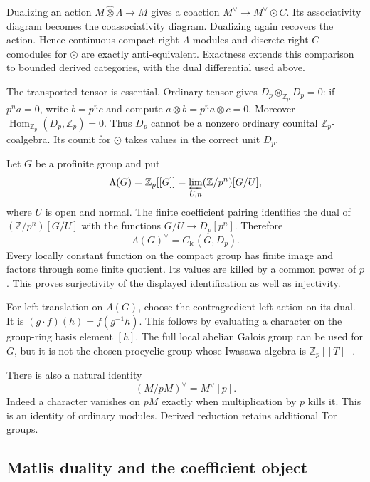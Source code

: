 Dualizing an action $M\widehat\otimes\Lambda\to M$ gives a
coaction $M^\vee\to M^\vee\odot C$. Its associativity diagram
becomes the coassociativity diagram. Dualizing again recovers the
action. Hence continuous compact right $\Lambda$-modules and
discrete right $C$-comodules for $\odot$ are exactly
anti-equivalent. Exactness extends this comparison to bounded
derived categories, with the dual differential used above.

The transported tensor is essential. Ordinary tensor gives
$D_p\otimes_{\mathbb Z_p}D_p=0$: if $p^na=0$, write $b=p^nc$
and compute $a\otimes b=p^na\otimes c=0$.
Moreover $\operatorname{Hom}_{\mathbb Z_p}(D_p,\mathbb Z_p)=0$.
Thus $D_p$ cannot be a nonzero ordinary counital
$\mathbb Z_p$-coalgebra. Its counit for $\odot$ takes values in
the correct unit $D_p$.

Let $G$ be a profinite group and put
\[
 \Lambda(G)=\mathbb Z_p[[G]]
 =\varprojlim_{U,n}(\mathbb Z/p^n)[G/U],
\]
where $U$ is open and normal. The finite coefficient pairing
identifies the dual of $(\mathbb Z/p^n)[G/U]$ with the functions
$G/U\to D_p[p^n]$. Therefore
\begin{equation}\label{v4-arith:md:eq:iwasawa-dual}
 \Lambda(G)^\vee=C_{\mathrm{lc}}(G,D_p).
\end{equation}
Every locally constant function on the compact group has finite
image and factors through some finite quotient. Its values are
killed by a common power of $p$. This proves surjectivity of the
displayed identification as well as injectivity.

For left translation on $\Lambda(G)$, choose the contragredient
left action on its dual. It is
$(g\cdot f)(h)=f(g^{-1}h)$. This follows by evaluating a character
on the group-ring basis element $[h]$. The full local abelian Galois
group can be used for $G$, but it is not the chosen procyclic group
whose Iwasawa algebra is $\mathbb Z_p[[T]]$.

There is also a natural identity
\begin{equation}\label{v4-arith:md:eq:reduction-torsion}
 (M/pM)^\vee=M^\vee[p].
\end{equation}
Indeed a character vanishes on $pM$ exactly when multiplication by
$p$ kills it. This is an identity of ordinary modules. Derived
reduction retains additional Tor groups.

\subsection{Matlis duality and the coefficient object}

